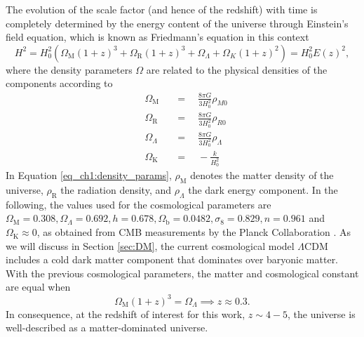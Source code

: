 The evolution of the scale factor (and hence of the redshift) with time is completely determined by the energy content of the universe through Einstein's field equation, which is known as Friedmann's equation in this context
\begin{equation}
    H^2=H_0^2\left( \Omega_\text{M} (1+z)^3+\Omega_\text{R} (1+z)^3 +\Omega_\Lambda + \Omega_K (1+z)^2 \right)=H_0^2E(z)^2,
\end{equation}
where the density parameters $\Omega$ are related to the physical densities of the components according to
\begin{equation}\label{eq_ch1:density_params}
    \begin{aligned}&\Omega_\text{M}&&=\quad\frac{8\pi G}{3H_0^2}\rho_{M0}\\&\Omega_\text{R}&&=\quad\frac{8\pi G}{3H_0^2}\rho_{R0}\\&\Omega_{\Lambda}&&=\quad\frac{8\pi G}{3H_0^2}\rho_{\Lambda}\\&\Omega_\text{K}&&=\quad-\frac k{H_0^2}\end{aligned}
\end{equation}
In Equation \ref{eq_ch1:density_params}, $\rho_\text{M}$ denotes the matter density of the universe, $\rho_\text{R}$ the radiation density, and $\rho_\Lambda$ the dark energy component. In the following, the values used for the cosmological parameters are $\Omega_\text{M}=0.308,\Omega_\Lambda=0.692,h=0.678,\Omega_\text{b}=0.0482,\sigma_8=0.829,n=0.961$ and $\Omega_\text{K}\approx 0$, as obtained from CMB measurements by the Planck Collaboration \cite{planck2014}. As we will discuss in Section \ref{sec:DM}, the current cosmological model $\Lambda$CDM includes a cold dark matter component that dominates over baryonic matter. With the previous cosmological parameters, the matter and cosmological constant are equal when
\begin{equation}
    \Omega_\text{M}(1+z)^3=\Omega_\Lambda \implies z\approx 0.3.
\end{equation}
In consequence, at the redshift of interest for this work, $z\sim 4-5$, the universe is well-described as a matter-dominated universe.








